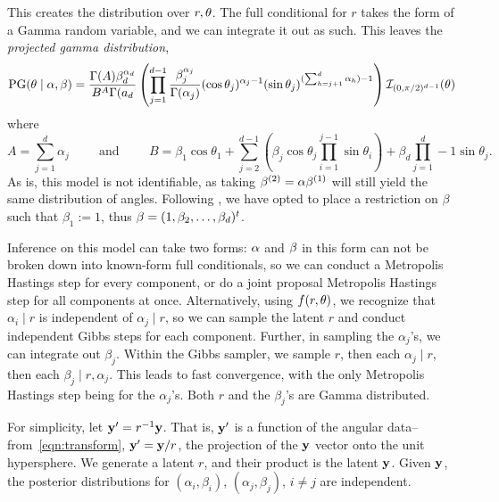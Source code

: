   This creates the distribution over $r,{\bf \theta}$.  The full conditional for
    $r$ takes the form of a Gamma random variable, and we can integrate it out as
    such.  This leaves the \emph{projected gamma distribution},
  \begin{equation}
    \text{PG}({\bf \theta}\mid{\bf \alpha},{\bf \beta}) = \frac{\Gamma(A)\beta_d^{\alpha_d}}{B^A\Gamma(a_d}\left(\prod_{j = 1}^{d-1}\frac{\beta_j^{\alpha_j}}{\Gamma(\alpha_j)}(\cos\theta_j)^{\alpha_j - 1}(\sin\theta_j)^{(\sum_{h = j + 1}^d\alpha_h) - 1}\right)\mathcal{I}_{(0,\pi/2)^{d-1}}({\bf \theta})
  \end{equation}
  where
  \begin{equation}
    A = \sum_{j = 1}^d\alpha_j \hspace{1cm}\text{and}\hspace{1cm}B = \beta_1\cos\theta_1 + \sum_{j = 2}^{d-1}\left(\beta_j\cos\theta_j\prod_{i = 1}^{j-1}\sin\theta_i\right) + \beta_d\prod_{j = 1}^d-1\sin\theta_j.
  \end{equation}
As is, this model is not identifiable, as taking
  ${\bf \beta}^{(2)} = \alpha {\bf \beta}^{(1)}$ will still yield the same
  distribution of angles. Following \cite{nunez2019}, we have opted to place a
  restriction on $\beta$ such that $\beta_1 := 1$, thus
  ${\bf \beta} = (1, \beta_2, \ldots, \beta_d)^t$.

Inference on this model can take two forms: ${\bf \alpha}$ and ${\bf \beta}$ in
  this form can not be broken down into known-form full conditionals, so we can
  conduct a Metropolis Hastings step for every component, or do a joint proposal
  Metropolis Hastings step for all components at once.  Alternatively, using
  $f(r,{\bf \theta})$, we recognize that $\alpha_i\mid r$ is independent of
  $\alpha_j\mid r$, so we can sample the latent $r$ and conduct independent
  Gibbs steps for each component.  Further, in sampling the $\alpha_j$'s, we can
  integrate out $\beta_j$. Within the Gibbs sampler, we sample $r$, then each
  $\alpha_j\mid r$, then each $\beta_j\mid r, \alpha_j$.  This leads to fast
  convergence, with the only Metropolis Hastings step being for the
  $\alpha_j$'s.  Both $r$ and the $\beta_j$'s are Gamma distributed.

For simplicity, let ${\bf y^{\prime}} = r^{-1}{\bf y}$.  That is,
  ${\bf y^{\prime}}$ is a function of the angular data--from~\eqref{eqn:transform},
  ${\bf y^{\prime}} = {\bf y}/r$, the projection of the ${\bf y}$ vector onto
  the unit hypersphere. We generate a latent $r$, and their product is the
  latent ${\bf y}$.  Given ${\bf y}$, the posterior distributions for
  $(\alpha_i, \beta_i)$, $(\alpha_j,\beta_j)$, $i\neq j$ are independent.

